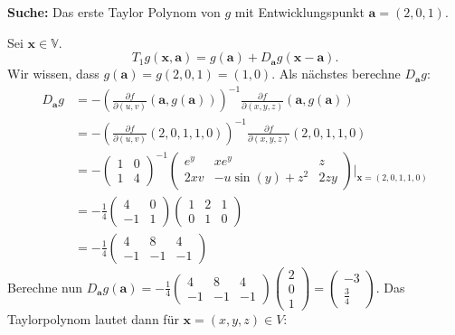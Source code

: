 \documentclass[a4paper, landscape,twocolumn,fontsize=9pt]{scrartcl}
\begin{document}
\textbf{Suche:} Das erste Taylor Polynom von $g$ mit Entwicklungspunkt $\mathbf a = (2,0,1)$. 

Sei $\mathbf x \in \mathbb V$.
\[
	T_1g(\mathbf x, \mathbf a) = g(\mathbf a) + D_{\mathbf a}g(\mathbf x - \mathbf a).
\]
Wir wissen, dass $g(\mathbf a) = g(2,0,1) = (1,0)$. Als nächstes berechne $D_{\mathbf a}g$:
\begin{align*}
	D_{\mathbf a}g& = -(\frac{\partial f}{\partial(u,v)}(\mathbf a, g(\mathbf a)))^{-1} \frac{\partial f}{\partial (x,y,z)}(\mathbf a, g(\mathbf a)) \\
	& = -(\frac{\partial f}{\partial(u,v)}(2,0,1,1,0))^{-1} \frac{\partial f}{\partial (x,y,z)}(2,0,1,1,0) \\
	&= - \begin{pmatrix}
			1 & 0 \\ 1 & 4
	\end{pmatrix}^{-1} \begin{pmatrix}
		e^y & xe^y & z \\
		2xv & -u\sin(y) + z^2 & 2zy
	\end{pmatrix}\Bigg \vert_{\mathbf x = (2,0,1,1,0)} \\
	&= -\frac{1}{4}\begin{pmatrix}
		4 & 0 \\ -1 & 1
	\end{pmatrix} \begin{pmatrix}
		1 & 2 & 1 \\ 0 & 1 & 0
	\end{pmatrix} \\
	&= -\frac{1}{4}\begin{pmatrix}
		4 & 8 & 4 \\
		-1 & -1 & -1
	\end{pmatrix}
\end{align*}
Berechne nun $D_\mathbf{a}g(\mathbf a) = -\frac{1}{4}\begin{pmatrix}
		4 & 8 & 4 \\
		-1 & -1 & -1
	\end{pmatrix}\begin{pmatrix}
		2 \\ 0 \\ 1
	\end{pmatrix} = \begin{pmatrix}
		-3 \\ \frac{3}{4}
	\end{pmatrix}$. 
Das Taylorpolynom lautet dann für $\mathbf x = (x,y,z) \in V$:
\end{document}
